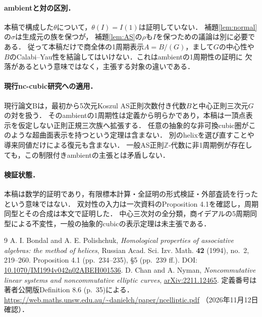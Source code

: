 \documentclass[10pt,a4paper]{ltjsarticle}
\newcommand{\Z}{\mathbb Z}
\begin{document}
\paragraph{ambientと対の区別．}
本稿で構成した$\theta$について，$\theta(I)=I(1)$は証明していない．
補題\ref{lem:normal}の$\sigma$は生成元の族を保つが，
補題\ref{lem:AS}の$\rho$も$I$を保つための議論は別に必要である．
従って本稿だけで商全体の1周期表示$A=B/(G)$，まして$G$の中心性や
$B$のCalabi--Yau性を結論してはいけない．これはambientの1周期性の証明に
欠落があるという意味ではなく，主張する対象の違いである．

\paragraph{現行nc-cubic研究への適用．}
現行論文Bは，最初から5次元Koszul AS正則次数付き代数$B$と中心正則三次元$G$の対を扱う．
そのambientの1周期性は定義から明らかであり，本稿は一頂点表示を仮定しない正則正規三次族へ拡張する．
任意の抽象的な非可換cubic圏がこのような超曲面表示を持つという定理は含まない．
別のhelixを選び直すことや導来同値だけによる復元も含まない．
一般AS正則$\Z$-代数に非1周期例が存在しても，この制限付きambientの主張とは矛盾しない．

\paragraph{検証状態．}
本稿は数学的証明であり，有限標本計算・全証明の形式検証・外部査読を行ったという意味ではない．
双対性の入力は一次資料のProposition 4.1を確認し，周期同型とその合成は本文で証明した．
中心三次対の全分類，商イデアルの5周期同型による不変性，一般の抽象的cubicの表示定理は未主張である．

\begin{thebibliography}{9}
A. I. Bondal and A. E. Polishchuk,
\emph{Homological properties of associative algebras: the method of helices},
Russian Acad. Sci. Izv. Math. \textbf{42} (1994), no.~2, 219--260.
Proposition 4.1 (pp.~234--235), \S5 (pp.~239 ff.).
DOI: \href{https://doi.org/10.1070/IM1994v042n02ABEH001536}{10.1070/IM1994v042n02ABEH001536}.
D. Chan and A. Nyman,
\emph{Noncommutative linear systems and noncommutative elliptic curves},
\href{https://arxiv.org/abs/2211.12465}{arXiv:2211.12465}.
定義番号は著者公開版Definition 8.6 (p.~35)による．
\url{https://web.maths.unsw.edu.au/~danielch/paper/ncelliptic.pdf}
（2026年11月12日確認）．
\end{thebibliography}
\end{document}

